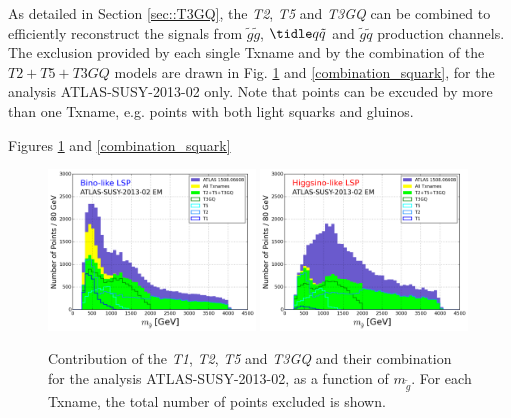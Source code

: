 \documentclass[a4paper,11pt]{article}
\newcommand{\MGLU}{$ m _{ \tilde g } $\xspace}
\begin{document}
%
%
As detailed in Section \ref{sec::T3GQ}, the \textit{T2}, \textit{T5} and \textit{T3GQ} can be combined to efficiently reconstruct the signals from $\tilde g \tilde g$, $\tidle q \tilde q$ and $\tilde g \tilde q$ production channels. The exclusion provided by each single Txname and by the combination of the $T2+T5+T3GQ$ models are drawn in Fig. 
\ref{combination_gluino} and \ref{combination_squark}, for the analysis ATLAS-SUSY-2013-02 only. Note that points can be excuded by more than one Txname, e.g. points with both light squarks and gluinos. 

%
%
Figures \ref{combination_gluino} and \ref{combination_squark} 
\begin{figure}[!b]
\begin{center}
\subfigure
\includegraphics[width=0.49\textwidth]{PLOTS/BINO_Txnames_Contribution_ATLAS02_Gluino.png}
\subfigure
{\includegraphics[width=0.49\textwidth]{PLOTS/HIGGSINO_Txnames_Contribution_ATLAS02_Gluino.png}}
\end{center}
\caption{Contribution of the \textit{T1}, \textit{T2}, \textit{T5} and \textit{T3GQ} and their combination for the analysis ATLAS-SUSY-2013-02, as a function of \MGLU. For each Txname, the total number of points excluded is shown.} 
\label{combination_gluino}
%
\end{figure}
\end{document}
